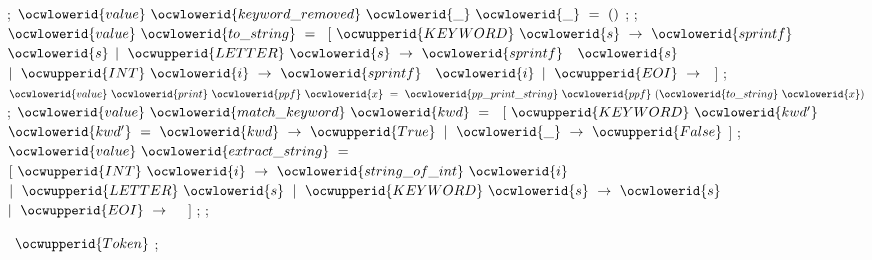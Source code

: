 \documentclass[12pt]{article}
\begin{document}
\ocwindent{3.00em}
;\ocweol
\ocwindent{3.00em}
$\ocwlowerid{value}~\ocwlowerid{keyword\_removed}~\ocwlowerid{\_}~\ocwlowerid{\_}~=~()$\ocweol
\ocwindent{3.00em}
;\ocweol
\ocwindent{2.00em}
\ocweol
\ocwindent{2.00em}
;\ocweol
\ocwindent{2.00em}
$\ocwlowerid{value}~\ocwlowerid{to\_string}~=~$\ocweol
\ocwindent{3.00em}
$[~\ocwupperid{KEYWORD}~\ocwlowerid{s}~\rightarrow{}~\ocwlowerid{sprintf}~$~$\ocwlowerid{s}$\ocweol
\ocwindent{3.00em}
$\mid{}~\ocwupperid{LETTER}~\ocwlowerid{s}~\rightarrow{}~\ocwlowerid{sprintf}~$~$\ocwlowerid{s}$\ocweol
\ocwindent{3.00em}
$\mid{}~\ocwupperid{INT}~\ocwlowerid{i}~\rightarrow{}~\ocwlowerid{sprintf}~$~$\ocwlowerid{i}$\ocweol
\ocwindent{3.00em}
$\mid{}~\ocwupperid{EOI}~\rightarrow{}~$\ocweol
\ocwindent{3.00em}
$]$\ocweol
\ocwindent{2.00em}
;\ocweol
\ocwindent{2.00em}
$\ocwlowerid{value}~\ocwlowerid{print}~\ocwlowerid{ppf}~\ocwlowerid{x}~=~\ocwlowerid{pp\_print\_string}~\ocwlowerid{ppf}~(\ocwlowerid{to\_string}~\ocwlowerid{x})$\ocweol
\ocwindent{2.00em}
;\ocweol
\ocwindent{2.00em}
$\ocwlowerid{value}~\ocwlowerid{match\_keyword}~\ocwlowerid{kwd}~=~$\ocweol
\ocwindent{3.00em}
$[~\ocwupperid{KEYWORD}~\ocwlowerid{kwd'}~$~$\ocwlowerid{kwd'}~=~\ocwlowerid{kwd}~\rightarrow{}~\ocwupperid{True}$\ocweol
\ocwindent{3.00em}
$\mid{}~\ocwlowerid{\_}~\rightarrow{}~\ocwupperid{False}$\ocweol
\ocwindent{3.00em}
$]$\ocweol
\ocwindent{2.00em}
;\ocweol
\ocwindent{2.00em}
$\ocwlowerid{value}~\ocwlowerid{extract\_string}~=~$\ocweol
\ocwindent{3.00em}
$[~\ocwupperid{INT}~\ocwlowerid{i}~\rightarrow{}~\ocwlowerid{string\_of\_int}~\ocwlowerid{i}$\ocweol
\ocwindent{3.00em}
$\mid{}~\ocwupperid{LETTER}~\ocwlowerid{s}~\mid{}~\ocwupperid{KEYWORD}~\ocwlowerid{s}~\rightarrow{}~\ocwlowerid{s}$\ocweol
\ocwindent{3.00em}
$\mid{}~\ocwupperid{EOI}~\rightarrow{}~$~\ocweol
\ocwindent{3.00em}
$]$\ocweol
\ocwindent{2.00em}
;\ocweol
\ocwindent{1.00em}
\ocweol
\ocwindent{1.00em}
;\medskip

\label{../ML/zen_lexer.ml:2304}%
\ocwindent{1.00em}
~$\ocwupperid{Token}$\ocweol
\ocwindent{1.00em}
;\medskip
\end{document}
